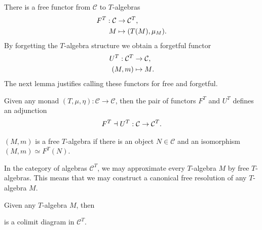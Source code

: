 \documentclass[../thesis.tex]{subfiles}
\begin{document}
        There is a free functor from $\mathcal{C}$ to $T$-algebras
        \begin{align*}
            F^T : \mathcal{C} & \rightarrow \mathcal{C}^T\tt{,} \\
            M & \mapsto (T(M), \mu_M)\tt{.}
        \end{align*}
        By forgetting the $T$-algebra structure we obtain a forgetful functor
        \begin{align*}
            U^T : \mathcal{C}^T & \rightarrow \mathcal{C}\tt{,} \\
            (M, m) & \mapsto M\tt{.}
        \end{align*}
        The next lemma justifies calling these functors for free and forgetful.        
        \begin{lemma}
            Given any monad $(T, \mu, \eta) : \mathcal{C} \rightarrow \mathcal{C}$, then the pair of functors $F^T$ and $U^T$ defines an adjunction
            \begin{align*}
                F^T \dashv U^T : \mathcal{C} \rightarrow \mathcal{C}^T\tt{.}
            \end{align*}
        \end{lemma}

        \begin{definition}
            $(M,m)$ is a free $T$-algebra if there is an object $N\in \mathcal{C}$ and an isomorphism $(M,m) \simeq F^T(N)$.
        \end{definition}
        In the category of algebras $\mathcal{C}^T$, we may approximate every $T$-algebra $M$ by free $T$-algebras. This means that we may construct a canonical free resolution of any $T$-algebra $M$.
        \begin{proposition}
            Given any $T$-algebra $M$, then
            \begin{center}
            \end{center}
            is a colimit diagram in $\mathcal{C}^T$.
        \end{proposition} 
\end{document}
